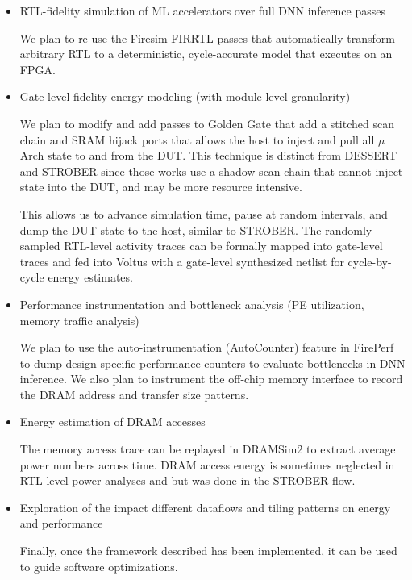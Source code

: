 \documentclass[sigconf]{acmart}
\begin{document}
\begin{itemize}
  \item RTL-fidelity simulation of ML accelerators over full DNN inference passes

    We plan to re-use the Firesim FIRRTL passes that automatically transform arbitrary RTL to a deterministic, cycle-accurate model that executes on an FPGA.

  \item Gate-level fidelity energy modeling (with module-level granularity)

    We plan to modify and add passes to Golden Gate that add a stitched scan chain and SRAM hijack ports that allows the host to inject and pull all $\mu$Arch state to and from the DUT.
    This technique is distinct from DESSERT and STROBER since those works use a shadow scan chain that cannot inject state into the DUT, and may be more resource intensive.

    This allows us to advance simulation time, pause at random intervals, and dump the DUT state to the host, similar to STROBER.
    The randomly sampled RTL-level activity traces can be formally mapped into gate-level traces and fed into Voltus with a gate-level synthesized netlist for cycle-by-cycle energy estimates.

  \item Performance instrumentation and bottleneck analysis (PE utilization, memory traffic analysis)

    We plan to use the auto-instrumentation (AutoCounter) feature in FirePerf\cite{fireperf} to dump design-specific performance counters to evaluate bottlenecks in DNN inference.
    We also plan to instrument the off-chip memory interface to record the DRAM address and transfer size patterns.

  \item Energy estimation of DRAM accesses

    The memory access trace can be replayed in DRAMSim2\cite{dramsim2} to extract average power numbers across time.
    DRAM access energy is sometimes neglected in RTL-level power analyses and but was done in the STROBER flow.

  \item Exploration of the impact different dataflows and tiling patterns on energy and performance

    Finally, once the framework described has been implemented, it can be used to guide software optimizations.
\end{itemize}
\end{document}
